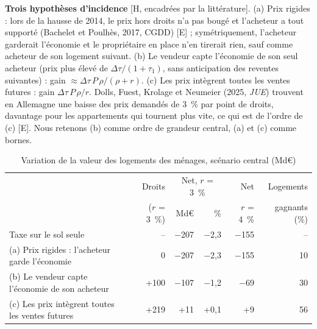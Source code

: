 \textbf{Trois hypothèses d'incidence} [H, encadrées par la littérature]. (a) Prix rigides : lors de la hausse de 2014,
le prix hors droits n'a pas bougé et l'acheteur a tout supporté (Bachelet et Poulhès, 2017, CGDD) [E] ; symétriquement,
l'acheteur garderait l'économie et le propriétaire en place n'en tirerait rien, sauf comme acheteur de son logement
suivant. (b) Le vendeur capte l'économie de son seul acheteur (prix plus élevé de $\Delta\tau/(1+\tau_1)$, sans
anticipation des reventes suivantes) : gain $\approx \Delta\tau\,P\,\rho/(\rho + r)$. (c) Les prix intègrent toutes les
ventes futures : gain $\Delta\tau\,P\,\rho/r$. Dolls, Fuest, Krolage et Neumeier (2025, \emph{JUE}) trouvent en
Allemagne une baisse des prix demandés de 3~\% par point de droits, davantage pour les appartements qui tournent plus
vite, ce qui est de l'ordre de (c) [E]. Nous retenons (b) comme ordre de grandeur central, (a) et (c) comme bornes.

\begin{table}[!htbp]\centering\scriptsize
\caption{Variation de la valeur des logements des ménages, scénario central (Md€)}\label{tab:fon4_cap}
\setlength{\tabcolsep}{4pt}
\begin{tabular}{@{}lrrrrr@{}}
\toprule
 & Droits & \multicolumn{2}{c}{Net, $r$ = 3~\%} & Net & Logements \\
\cmidrule(lr){3-4}
 & ($r$ = 3~\%) & Md€ & \% & $r$ = 4~\% & gagnants (\%) \\
\midrule
Taxe sur le sol seule & -- & $-$207 & $-$2,3 & $-$155 & -- \\
(a) Prix rigides : l'acheteur garde l'économie & 0 & $-$207 & $-$2,3 & $-$155 & 10 \\
(b) Le vendeur capte l'économie de son acheteur & +100 & $-$107 & $-$1,2 & $-$69 & 30 \\
(c) Les prix intègrent toutes les ventes futures & +219 & +11 & +0,1 & +9 & 56 \\
\bottomrule
\end{tabular}
\par\vspace{2pt}{\raggedright\scriptsize Valeur des logements des ménages : 8\,948~Md€
(Insee, fin 2025). Calcul logement par logement avec la rotation de sa commune et de son type ; Md€ France entière.
Logements gagnants : dont la valeur nette monte. Pour l'ensemble des biens privés, (c) donne
$-$64~Md€ (taxe $-$333, droits
+269).\par}
\end{table}

